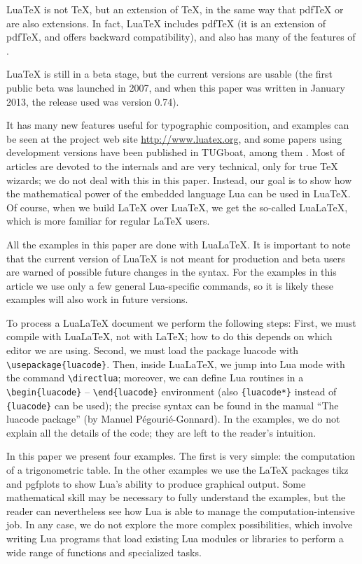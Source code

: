 \documentclass{pracjourn}[2006/02/20]
\begin{document}
Lua\TeX{} is not \TeX{}, but an extension of \TeX{}, in the same way that pdf\TeX{} or \XeTeX{} are also extensions.
In fact, Lua\TeX{} includes pdf\TeX{} (it is an extension of pdf\TeX{}, and offers backward compatibility), 
and also has many of the features of \XeTeX.

Lua\TeX{} is still in a beta stage, but the current versions are usable (the first public beta was launched in 2007,
and when this paper was written in January 2013, the release used was version 0.74). 

It has many new features useful for typographic composition, and examples can be seen at the project web site \url{http://www.luatex.org},
and some papers using development versions have been published in TUGboat, among them \cite{HoHe, Ha, Is2010, Is2012,Ma, Reu}. Most of articles are devoted to the internals and are very technical, only for true \TeX{} wizards; we do not deal with this in this paper. 
Instead, our goal is to show how the mathematical power of the embedded language Lua can be used in Lua\TeX{}.
Of course, when we build \LaTeX{} over Lua\TeX{}, we get the so-called Lua\LaTeX{}, which is more familiar for regular \LaTeX{} users.

All the examples in this paper are done with Lua\LaTeX{}.
It is important to note that the current version of Lua\TeX{} is not meant for production and beta users are warned of possible future changes in the syntax.
For the examples in this article we use only a few general Lua-specific commands, so it is likely these examples will also work in future versions. 

To process a Lua\LaTeX{} document we perform the following steps:
First, we must compile with Lua\LaTeX{}, not with \LaTeX{}; how to do this depends on which editor we are using.
Second, we must load the package \textsf{luacode} with \verb|\usepackage{luacode}|.
Then, inside Lua\LaTeX{}, we jump into Lua mode with the command \verb|\directlua|; moreover, we can define Lua routines in a \verb|\begin{luacode}| -- \verb|\end{luacode}| environment (also \verb|{luacode*}| instead of \verb|{luacode}| can be used);
the precise syntax can be found in the manual ``The \textsf{luacode} package'' (by Manuel P\'egouri\'e-Gonnard).
In the examples, we do not explain all the details of the code; they are left to the reader's intuition.

In this paper we present four examples. The first is very simple: the computation of a  trigonometric table. In the other examples we use the \LaTeX{} packages \textsf{tikz} and \textsf{pgfplots} to show Lua's ability to produce graphical output. 
Some mathematical skill may be necessary to fully understand the examples, but the reader can nevertheless see how Lua is able to manage the computation-intensive job. In any case, we do not explore the more complex possibilities, which involve writing Lua programs that load existing Lua modules or libraries to perform a wide range of functions and specialized tasks. 
\end{document}
